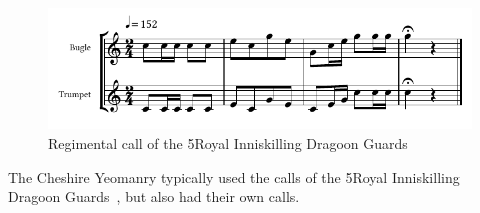 \begin{figure}[h]
  \centering
  \includegraphics[width=\textwidth]{gazette/5ridg-call.pdf}
  \caption*{Regimental call of the 5\nth Royal Inniskilling Dragoon Guards~\cite[p3]{trumpet-and-bugle-calls}}
\end{figure}

\vfill

The Cheshire Yeomanry typically used the calls of the 5\nth Royal Inniskilling Dragoon Guards~\cite[p11]{trumpet-and-bugle-calls}, but also had their own calls.

\vfill

\pagebreak

\vspace*{10mm}


\vfill

